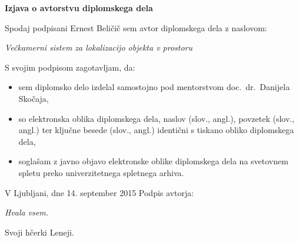 \documentclass[a4paper, 12pt]{book}
\newcommand{\clearemptydoublepage}{\newpage{\pagestyle{empty}\cleardoublepage}}
\begin{document}
\vspace{2cm}

\clearemptydoublepage

\vspace*{1cm}
\begin{center}
{\Large \textbf{\sc Izjava o avtorstvu diplomskega dela}}
\end{center}

\vspace{1cm}
\noindent Spodaj podpisani Ernest Beličič sem avtor  diplomskega dela z naslovom:

\vspace{0.5cm}
\emph{Večkamerni sistem za lokalizacijo objekta v prostoru}

\vspace{1.5cm}
\noindent S svojim podpisom zagotavljam, da:
\begin{itemize}
	\item sem diplomsko delo izdelal samostojno pod mentorstvom
		doc.\ dr.\ Danijela Skočaja,

	\item	so elektronska oblika diplomskega dela, naslov (slov., angl.), povzetek (slov., angl.) ter ključne besede (slov., angl.) identični s tiskano obliko diplomskega dela,
	\item soglašam z javno objavo elektronske oblike diplomskega dela na svetovnem spletu preko univerzitetnega spletnega arhiva.	
\end{itemize}

\vspace{1cm}
\noindent V Ljubljani, dne 14. september 2015 \hfill Podpis avtorja:

\clearemptydoublepage

\thispagestyle{empty}\mbox{}\vfill\null\it%
Hvala vsem.
\rm\normalfont

\clearemptydoublepage

\thispagestyle{empty}\mbox{}{\textheight}\mbox{}\hfill\begin{minipage}{0.55\textwidth}%
Svoji hčerki Leneji.
\normalfont\end{minipage}

\clearemptydoublepage

\def\thepage{}%
\tableofcontents{}
\end{document}
